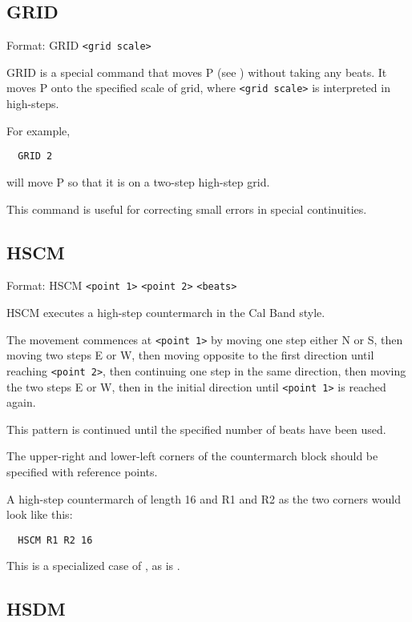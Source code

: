 \subsection{GRID}\label{grid}

Format: GRID \verb$<grid scale>$

GRID is a special command that moves P (see )
without taking any beats.  It moves P onto the specified scale of grid,
where \verb$<grid scale>$ is interpreted in high-steps.

For example,
\begin{verbatim}
  GRID 2
\end{verbatim}
will move P so that it is on a two-step high-step grid.

This command is useful for correcting small errors in special continuities.

\subsection{HSCM}\label{hscm}

Format: HSCM \verb$<point 1>$ \verb$<point 2>$ \verb$<beats>$

HSCM executes a high-step countermarch in the Cal Band style.

The movement commences at \verb$<point 1>$ by moving one step either N or S,
then moving two steps E or W, then moving opposite to the first direction
until reaching \verb$<point 2>$, then continuing one step in the same
direction, then moving the two steps E or W, then in the initial direction
until \verb$<point 1>$ is reached again.

This pattern is continued until the specified number of beats have been used.

The upper-right and lower-left corners of the countermarch block should be
specified with reference points.

A high-step countermarch of length 16 and R1 and R2 as the two corners would
look like this:
\begin{verbatim}
  HSCM R1 R2 16
\end{verbatim}

This is a specialized case of , as is
.

\subsection{HSDM}\label{hsdm}

